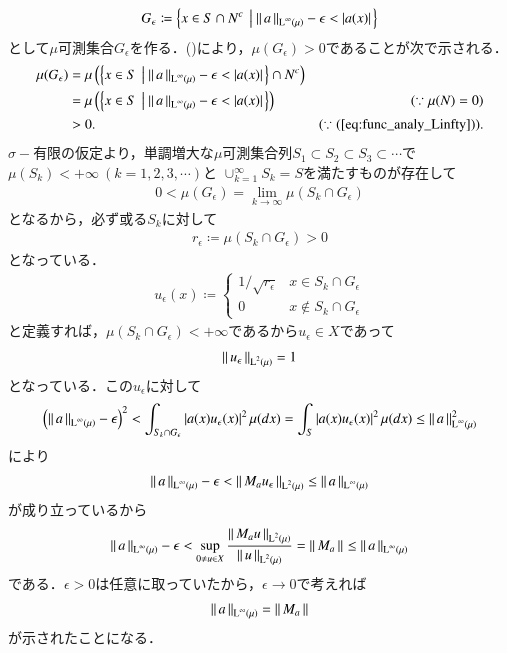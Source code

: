 \begin{prf}
\begin{description}
		\begin{align}
			G_\epsilon \coloneqq \left\{ x \in S \cap N^c\ \left|\ \Norm{a}{\Lp{\infty}{\mu}} - \epsilon < |a(x)| \right.\right\}
		\end{align}
		として$\mu$可測集合$G_\epsilon$を作る．()により，$\mu(G_\epsilon) > 0$であることが次で示される．
		\begin{align}
			\mu(G_\epsilon) &= \mu\left(\left\{x \in S\ \left|\ \Norm{a}{\Lp{\infty}{\mu}}-\epsilon < |a(x)|\right.\right\} \cap N^c\right) \\
			&= \mu\left(\left\{x \in S\ \left|\ \Norm{a}{\Lp{\infty}{\mu}}-\epsilon < |a(x)|\right.\right\}\right) & (\because \mu(N)=0) \\
			&> 0. & (\because (\refeq{eq:func_analy_Linfty})).
 		\end{align}
		$\sigma-$有限の仮定より，単調増大な$\mu$可測集合列$S_1 \subset S_2 \subset S_3 \subset \cdots$で$\mu(S_k) < +\infty\ (k=1,2,3,\cdots)$と
		$\cup_{k=1}^{\infty}S_k = S$を満たすものが存在して
		\begin{align}
			0 < \mu(G_\epsilon) = \lim_{k \to \infty} \mu(S_k \cap G_\epsilon)
		\end{align}
		となるから，必ず或る$S_{k}$に対して
		\begin{align}
			r_\epsilon \coloneqq \mu(S_{k} \cap G_\epsilon) > 0
		\end{align}
		となっている．
		\begin{align}
			u_\epsilon(x) \coloneqq 
			\begin{cases}
				1/\sqrt{r_\epsilon} & x \in S_{k} \cap G_\epsilon \\
				0 & x \notin S_{k} \cap G_\epsilon
			\end{cases}
		\end{align}
		と定義すれば，$\mu(S_{k} \cap G_\epsilon) < +\infty$であるから$u_\epsilon \in X$であって
		\begin{align}
			\left\|\, u_\epsilon\, \right\|_{\operatorname{L}^{2} \left(\mu\right)} = 1
		\end{align}
		となっている．この$u_\epsilon$に対して
		\begin{align}
			\left(\left\|\, a\, \right\|_{\operatorname{L}^{\infty} \left(\mu\right)} - \epsilon\right)^2 
			< \int_{S_k \cap G_\epsilon} |a(x)u_\epsilon(x)|^2\, \mu(dx) 
			= \int_{S} |a(x)u_\epsilon(x)|^2\, \mu(dx)
			\leq \left\|\, a\, \right\|_{\operatorname{L}^{\infty} \left(\mu\right)}^2
		\end{align}
		により
		\begin{align}
			\left\|\, a\, \right\|_{\operatorname{L}^{\infty} \left(\mu\right)} - \epsilon < \left\|\, M_a u_\epsilon\, \right\|_{\operatorname{L}^{2} \left(\mu\right)} \leq \left\|\, a\, \right\|_{\operatorname{L}^{\infty} \left(\mu\right)}
		\end{align}
		が成り立っているから
		\begin{align}
			\left\|\, a\, \right\|_{\operatorname{L}^{\infty} \left(\mu\right)} - \epsilon 
			< \operatorname*{sup}_{0 \neq u \in X} \frac{\left\|\, M_a u\, \right\|_{\operatorname{L}^{2} \left(\mu\right)}}{\left\|\, u\, \right\|_{\operatorname{L}^{2} \left(\mu\right)}} = \left\|\, M_a\, \right\|_{} 
			\leq \left\|\, a\, \right\|_{\operatorname{L}^{\infty} \left(\mu\right)}
		\end{align}
		である．$\epsilon > 0$は任意に取っていたから，$\epsilon \rightarrow 0$で考えれば
		\begin{align}
			\left\|\, a\, \right\|_{\operatorname{L}^{\infty} \left(\mu\right)} = \left\|\, M_a\, \right\|_{}
		\end{align}
		が示されたことになる．
		

\end{description}
\end{prf}
